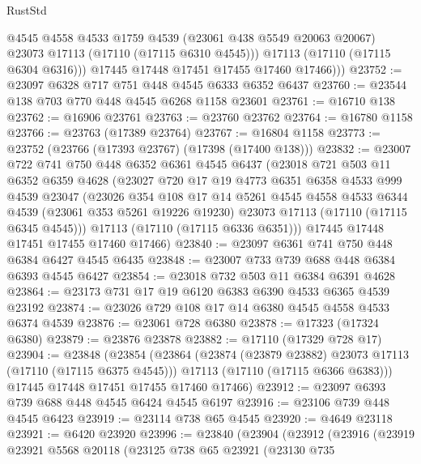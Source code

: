 \begin{lexlean}{RustStd}
\begin{coremodule}
              @4545
              @4558
              @4533
              @1759
              @4539
              (@23061 @438 @5549 @20063 @20067)
              @23073
              @17113
              (@17110 (@17115 @6310 @4545)))
            @17113
            (@17110 (@17115 @6304 @6316)))
          @17445
          @17448
          @17451
          @17455
          @17460
          @17466)))
@23752 := @23097 @6328 @717 @751 @448 @4545 @6333 @6352 @6437
@23760 := @23544 @138 @703 @770 @448 @4545 @6268 @1158 @23601
@23761 := @16710 @138
@23762 := @16906 @23761
@23763 := @23760 @23762
@23764 := @16780 @1158
@23766 := @23763 (@17389 @23764)
@23767 := @16804 @1158
@23773 := @23752 (@23766 (@17393 @23767) (@17398 (@17400 @138)))
@23832 := @23007
    @722
    @741
    @750
    @448
    @6352
    @6361
    @4545
    @6437
    (@23018
      @721
      @503
      @11
      @6352
      @6359
      @4628
      (@23027
        @720
        @17
        @19
        @4773
        @6351
        @6358
        @4533
        @999
        @4539
        @23047
        (@23026
          @354
          @108
          @17
          @14
          @5261
          @4545
          @4558
          @4533
          @6344
          @4539
          (@23061 @353 @5261 @19226 @19230)
          @23073
          @17113
          (@17110 (@17115 @6345 @4545)))
        @17113
        (@17110 (@17115 @6336 @6351)))
      @17445
      @17448
      @17451
      @17455
      @17460
      @17466)
@23840 := @23097 @6361 @741 @750 @448 @6384 @6427 @4545 @6435
@23848 := @23007 @733 @739 @688 @448 @6384 @6393 @4545 @6427
@23854 := @23018 @732 @503 @11 @6384 @6391 @4628
@23864 := @23173 @731 @17 @19 @6120 @6383 @6390 @4533 @6365 @4539 @23192
@23874 := @23026 @729 @108 @17 @14 @6380 @4545 @4558 @4533 @6374 @4539
@23876 := @23061 @728 @6380
@23878 := @17323 (@17324 @6380)
@23879 := @23876 @23878
@23882 := @17110 (@17329 @728 @17)
@23904 := @23848
    (@23854
      (@23864
        (@23874 (@23879 @23882) @23073 @17113 (@17110 (@17115 @6375 @4545)))
        @17113
        (@17110 (@17115 @6366 @6383)))
      @17445
      @17448
      @17451
      @17455
      @17460
      @17466)
@23912 := @23097 @6393 @739 @688 @448 @4545 @6424 @4545 @6197
@23916 := @23106 @739 @448 @4545 @6423
@23919 := @23114 @738 @65 @4545
@23920 := @4649 @23118
@23921 := @6420 @23920
@23996 := @23840
    (@23904
      (@23912
        (@23916
          (@23919
            @23921
            @5568
            @20118
            (@23125
              @738
              @65
              @23921
              (@23130
                @735

\end{coremodule}
\end{lexlean}
